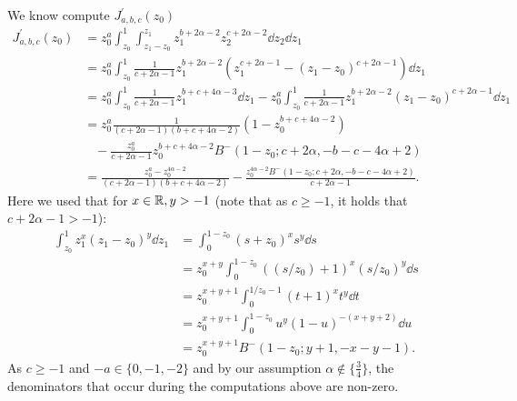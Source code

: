 We know compute $J_{a,b,c}^\prime(z_0)$
\begin{align*}
	J_{a,b,c}^\prime(z_0) 
	&= z_0^a \int_{z_0}^1 \int_{z_1-z_0}^{z_1}  z_1^{b+2\alpha-2} z_2^{c+2\alpha-2} {\dd} z_2 {\dd} z_1  \\
 	&= z_0^a \int_{z_0}^1 \frac{1}{c+2\alpha-1}  z_1^{b+2\alpha-2}( z_1^{c+2\alpha-1}-(z_1-z_0)^{c+2\alpha-1})  {\dd} z_1  \\
 	&=z_0^a \int_{z_0}^1 \frac{1}{c+2\alpha-1} z_1^{b+c+4\alpha-3} {\dd } z_1 -z_0^{a} \int_{z_0}^1 	
 		\frac{1}{c+2\alpha-1}z_1^{b+2\alpha-2}(z_1-z_0)^{c+2\alpha-1}  {\dd} z_1  \\
 	&= z_0^a  \frac{1}{(c+2\alpha-1)(b+c+4\alpha-2)}(1-z_0^{b+c+4\alpha-2}) \\
 	&\hspace{10pt}- \frac{z_0^a}{c+2\alpha-1}z_0^{b+c+4\alpha-2}B^-(1-z_0;c+2\alpha,-b-c-4\alpha+2) \\
	&= \frac{z_0^a -z_0^{4\alpha-2}}{(c+2\alpha-1)(b+c+4\alpha-2)}  
		- \frac{z_0^{4\alpha -2}B^-(1-z_0;c+2\alpha,-b-c-4\alpha+2)}{c+2\alpha-1}.  
\end{align*}
Here we used that for $x  \in {\ensuremath{\mathbb R}},y>-1$ (note that as $c\geq -1$, it holds that $c+2\alpha-1 >-1$):
\begin{align*}
 \int_{z_0}^{1} z_1^x (z_1-z_0)^y {\dd} z_1 
 &= \int_0^{1-z_0} (s+z_0)^x s^y {\dd} s \\
 &= z_0^{x+y} \int_0^{1-z_0} \left( (s/z_0) + 1 \right)^x (s/z_0)^y {\dd} s \\
 &= z_0^{x+y+1} \int_{0}^{1/z_0 -1 } (t+1)^x t^y {\dd} t \\
 &= z_0^{x+y+1} \int_0^{1-z_0} u^y (1-u)^{-(x+y+2)} {\dd} u \\
 &= z_0^{x+y+1} B^-(1-z_0; y+1,-x-y-1 ).
\end{align*}
As $c \geq -1$ and $-a \in \{0,-1,-2\}$ and by our assumption $\alpha \not \in \{\frac{3}{4}\}$, the denominators 
that occur during the computations above are non-zero. 


